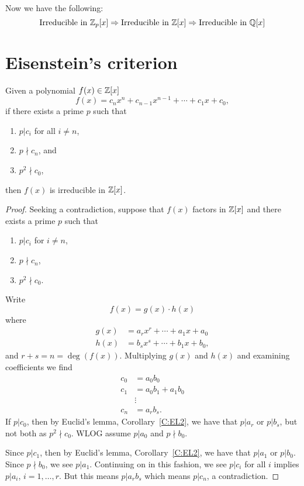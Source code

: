 \documentclass{ximera}
\begin{document}
Now we have the following:
\[
\text{Irreducible in $\mathbb Z_p[x]$} \Rightarrow \text{Irreducible in $\mathbb Z[x]$}  \Rightarrow \text{Irreducible in $\mathbb Q[x]$}
\]


\section{Eisenstein's criterion}



\begin{theorem}\label{T:ec}
  Given a polynomial $f(x) \in\mathbb Z[x]$
  \[
  f(x) = c_nx^n + c_{n-1}x^{n-1} + \cdots + c_1 x + c_0,
  \]
  if there exists a prime $p$ such that
  \begin{enumerate}
  \item $p|c_i$ for all $i \ne n$,
  \item $p\nmid c_n$, and
  \item $p^2\nmid c_0$,
  \end{enumerate}
  then $f(x)$ is irreducible in $\mathbb Z[x]$.
  \begin{proof}
    Seeking a contradiction, suppose that $f(x)$ factors in $\mathbb Z[x]$ and there exists a prime $p$ such that
  \begin{enumerate}
  \item $p|c_i$ for $i \ne n$,
  \item $p\nmid c_n$,
  \item $p^2\nmid c_0$.
  \end{enumerate}
  Write
  \[
  f(x) = g(x) \cdot h(x)
  \]
  where
  \begin{align*}
    g(x) &= a_rx^r + \cdots + a_1 x+ a_0\\
    h(x) &= b_sx^s + \cdots + b_1 x+ b_0,
  \end{align*}
  and $r + s = n = \deg(f(x))$. Multiplying $g(x)$ and $h(x)$ and
  examining coefficients we find
  \begin{align*}
    c_0 &= a_0b_0\\
    c_1 &= a_0b_1 + a_1 b_0\\
    &\vdots \\
    c_n &= a_r b_s.
  \end{align*}
  If $p| c_0$, then by Euclid's lemma, Corollary~\ref{C:EL2}, we have
    that $p|a_r$ or $p|b_s$, but not both as $p^2\nmid c_0$. WLOG
    assume $p|a_0$ and $p\nmid b_0$.

    Since $p|c_1$, then by Euclid's lemma, Corollary~\ref{C:EL2}, we
    have that $p|a_1$ or $p|b_0$. Since $p\nmid b_0$, we see
    $p|a_1$. Continuing on in this fashion, we see $p|c_i$ for all $i$
    implies $p| a_i$, $i=1,\dots, r$. But this means $p|a_rb_s$ which
    means $p|c_n$, a contradiction.
  \end{proof}
\end{theorem}
\end{document}
